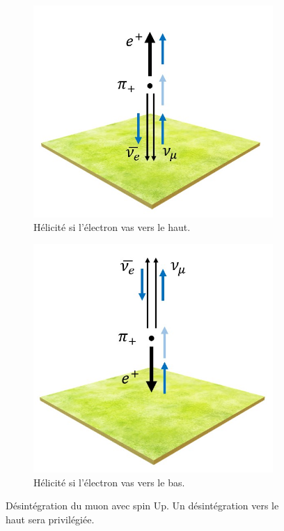 \documentclass[12pt]{article}
\begin{document}
\begin{figure}[htbp!] 
\centering  
    \begin{subfigure}[t]{.45\textwidth}
    \includegraphics[width=.9\textwidth]{Images/Photos/HeliciteElecUp.jpg}
    \captionsetup{width=0.8\textwidth}
    \caption{Hélicité si l'électron vas vers le haut.}
    \label{fig:HeliciteElecUp}
    \end{subfigure}
    \begin{subfigure}[t]{.45\textwidth}
    \includegraphics[width=.9\textwidth]{Images/Photos/HeliciteElecDown.jpg}
    \captionsetup{width=0.8\textwidth}
    \caption{Hélicité si l'électron vas vers le bas.}
    \label{fig:HeliciteElecDown}
    \end{subfigure}
\caption{Désintégration du muon avec spin Up. Un désintégration vers le haut sera privilégiée.}
\label{HelicitéElecUpDown}
\end{figure}
\end{document}
